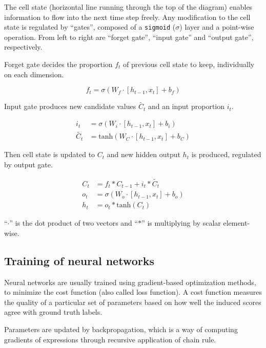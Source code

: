 \documentclass[11pt,a4paper]{report}
\begin{document}

The cell state (horizontal line running through the top of the diagram) enables information to flow into the next time step freely.
Any modification to the cell state is regulated by \enquote{gates}, composed of a \texttt{sigmoid} (\(\sigma\)) layer and a point-wise operation.
From left to right are \enquote{forget gate}, \enquote{input gate} and \enquote{output gate}, respectively.

Forget gate decides the proportion \(f_t\) of previous cell state to keep, individually on each dimension.

\begin{equation*}
  f_t = \sigma (W_f \cdot [h_{t-1}, x_t] + b_f)
\end{equation*}

Input gate produces new candidate values \(\tilde{C_t}\) and an input proportion \(i_t\).

\begin{align*}
  i_t & = \sigma (W_i \cdot [h_{t-1}, x_t] + b_i) \\
  \tilde{C_t} & = \mathrm{tanh} (W_C \cdot [h_{t-1}, x_t] + b_C)
\end{align*}

Then cell state is updated to \(C_t\) and new hidden output \(h_t\) is produced, regulated by output gate.

\begin{align*}
  C_t & = f_t * C_{t-1} + i_t * \tilde{C_t} \\
  o_t & = \sigma (W_o \cdot [h_{t-1}, x_t] + b_o) \\
  h_t & = o_t * \mathrm{tanh}(C_t)
\end{align*}

\enquote{\(\cdot\)} is the dot product of two vectors and \enquote{\(*\)} is multiplying by scalar element-wise.

\subsection{Training of neural networks}

Neural networks are usually trained using gradient-based optimization methods, to minimize the cost function (also called loss function).
A cost function measures the quality of a particular set of parameters based on how well the induced scores agree with ground truth labels.

Parameters are updated by backpropagation, which is a way of computing gradients of expressions through recursive application of chain rule.
\end{document}
